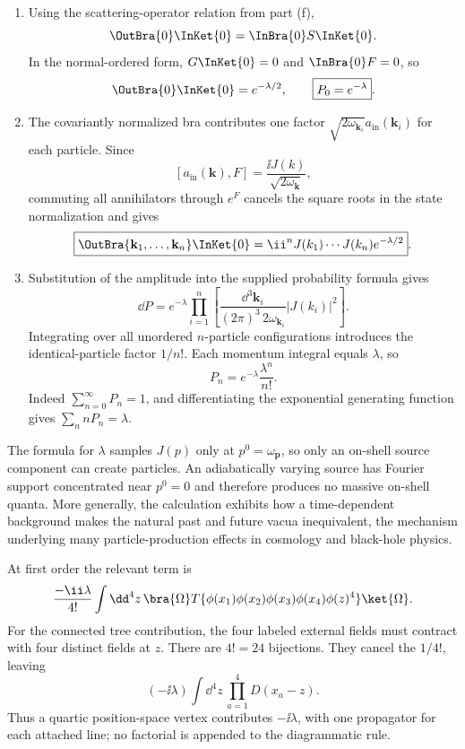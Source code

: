 \begin{enumerate}
\begin{enumerate}
\item
Using the scattering-operator relation from part (f),
\[
 \OutBra{0}\InKet{0}=\InBra{0}S\InKet{0}.
\]
In the normal-ordered form, \(G\InKet{0}=0\) and
\(\InBra{0}F=0\), so
\[
 \OutBra{0}\InKet{0}=e^{-\lambda/2},
 \qquad
 \boxed{P_0=e^{-\lambda}}.
\]

\item
The covariantly normalized bra contributes one factor
\(\sqrt{2\omega_{\mathbf k_i}}a_{\mathrm{in}}(\mathbf k_i)\) for each
particle.  Since
\[
 [a_{\mathrm{in}}(\mathbf k),F]
 =\frac{\ii J(k)}{\sqrt{2\omega_{\mathbf k}}},
\]
commuting all annihilators through \(e^F\) cancels the square roots in the
state normalization and gives
\[
 \boxed{
 \OutBra{\mathbf k_1,\ldots,\mathbf k_n}\InKet{0}
 =\ii^nJ(k_1)\cdots J(k_n)e^{-\lambda/2}}.
\]

\item
Substitution of the amplitude into the supplied probability formula gives
\[
 \dd P=e^{-\lambda}\prod_{i=1}^n
 \left[
 \frac{\dd^3\mathbf k_i}{(2\pi)^3\,2\omega_{\mathbf k_i}}
 |J(k_i)|^2
 \right].
\]
Integrating over all unordered \(n\)-particle configurations introduces the
identical-particle factor \(1/n!\).  Each momentum integral equals
\(\lambda\), so
\[
 \boxed{P_n=e^{-\lambda}\frac{\lambda^n}{n!}}.
\]
Indeed \(\sum_{n=0}^\infty P_n=1\), and differentiating the exponential
generating function gives \(\sum_n nP_n=\lambda\).
\end{enumerate}

The formula for \(\lambda\) samples \(J(p)\) only at
\(p^0=\omega_{\mathbf p}\), so only an on-shell source component can create
particles.  An adiabatically varying source has Fourier support concentrated
near \(p^0=0\) and therefore produces no massive on-shell quanta.  More
generally, the calculation exhibits how a time-dependent background makes
the natural past and future vacua inequivalent, the mechanism underlying many
particle-production effects in cosmology and black-hole physics.

At first order the relevant term is
\[
 \frac{-\ii\lambda}{4!}\int \dd^4z\,
 \bra{\Omega}T\{\phi(x_1)\phi(x_2)\phi(x_3)\phi(x_4)\phi(z)^4\}
 \ket{\Omega}.
\]
For the connected tree contribution, the four labeled external fields
must contract with four distinct fields at \(z\).  There are
\(4!=24\) bijections.  They cancel the \(1/4!\), leaving
\[
 (-\ii\lambda)\int \dd^4z\,
 \prod_{a=1}^4D(x_a-z).
\]
Thus a quartic position-space vertex contributes \(-\ii\lambda\), with one
propagator for each attached line; no factorial is appended to the
diagrammatic rule.


\end{enumerate}
